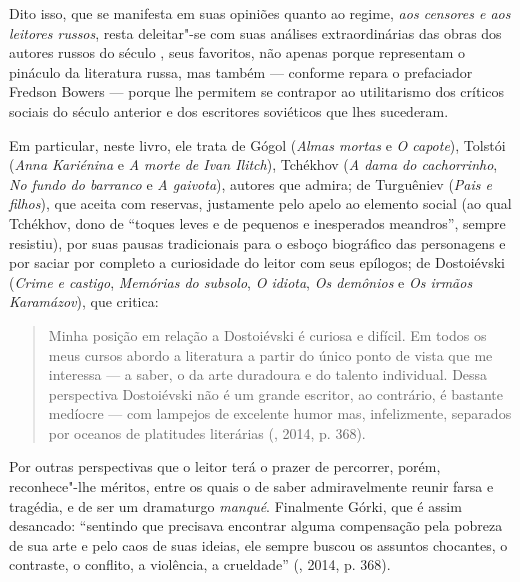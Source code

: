 Dito isso, que se manifesta em suas opiniões quanto ao regime, \emph{aos
censores e aos leitores russos}, resta deleitar"-se com suas análises
extraordinárias das obras dos autores russos do século , seus
favoritos, não apenas porque representam o pináculo da literatura russa,
mas também --- conforme repara o prefaciador Fredson Bowers --- porque
lhe permitem se contrapor ao utilitarismo dos críticos sociais do século
anterior e dos escritores soviéticos que lhes sucederam.

Em particular, neste livro, ele trata de Gógol (\emph{Almas mortas} e
\emph{O capote}), Tolstói (\emph{Anna Kariénina} e \emph{A morte de Ivan
Ilitch}), Tchékhov (\emph{A dama do cachorrinho}, \emph{No fundo do
barranco} e \emph{A gaivota}), autores que admira; de Turguêniev
(\emph{Pais e filhos}), que aceita com reservas, justamente pelo apelo
ao elemento social (ao qual Tchékhov, dono de ``toques leves e de
pequenos e inesperados meandros'', sempre resistiu), por suas pausas
tradicionais para o esboço biográfico das personagens e por saciar por
completo a curiosidade do leitor com seus epílogos; de Dostoiévski
(\emph{Crime e castigo}, \emph{Memórias do subsolo}, \emph{O idiota},
\emph{Os demônios} e \emph{Os irmãos Karamázov}), que critica:

\begin{quotation}
Minha posição em relação a Dostoiévski é curiosa e difícil. Em todos os meus
cursos abordo a literatura a partir do único ponto de vista que me
interessa --- a saber, o da arte duradoura e do talento individual. Dessa
perspectiva Dostoiévski não é um grande escritor, ao contrário, é
bastante medíocre --- com lampejos de excelente humor mas, infelizmente,
separados por oceanos de platitudes literárias (, 2014, p. 368).
\end{quotation}

Por outras perspectivas que o leitor terá o prazer de percorrer, porém,
reconhece"-lhe méritos, entre os quais o de saber admiravelmente reunir
farsa e tragédia, e de ser um dramaturgo \emph{manqué}. Finalmente
Górki, que é assim desancado: ``sentindo que precisava encontrar alguma
compensação pela pobreza de sua arte e pelo caos de suas ideias, ele
sempre buscou os assuntos chocantes, o contraste, o conflito, a
violência, a crueldade'' (, 2014, p. 368).

